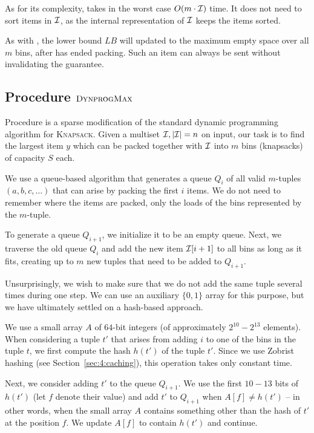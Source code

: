 As for its complexity, \bfd takes in the worst case $O(m \cdot {\mathcal I})$
time. It does not need to sort items in ${\mathcal I}$, as the internal
representation of ${\mathcal I}$ keeps the items sorted.

As with \obf, the lower bound $LB$ will updated to the maximum empty
space over all $m$ bins, after \bfd has ended packing. Such an item
can always be sent without invalidating the \binstretch guarantee.

\subsection{Procedure $\textsc{DynprogMax}$}\label{sec:4:dynprogmax}

Procedure \DynprogMax is a sparse modification of the standard dynamic
programming algorithm for \textsc{Knapsack}. Given a multiset ${\mathcal I},
|{\mathcal I}| = n$ on input, our task is to find the largest item $y$
which can be packed together with ${\mathcal I}$ into $m$ bins (knapsacks) of
capacity $S$ each.


We use a queue-based algorithm that generates a queue $Q_i$ of all
valid $m$-tuples $(a,b,c,\ldots)$ that can arise by packing the first
$i$ items. We do not need to remember where the items are packed, only
the loads of the bins represented by the $m$-tuple.

To generate a queue $Q_{i+1}$, we initialize it to be an empty queue.
Next, we traverse the old queue $Q_i$ and add the new item
${\mathcal I}[i+1]$ to all bins as long as it fits, creating up to $m$ new
tuples that need to be added to $Q_{i+1}$.

Unsurprisingly, we wish to make sure that we do not add the same tuple
several times during one step. We can use an auxiliary $\{0,1\}$ array
for this purpose, but we have ultimately settled on a hash-based
approach.

We use a small array $A$ of $64$-bit integers (of approximately $2^{10} -
2^{13}$ elements). When considering a tuple $t'$ that arises from
adding $i$ to one of the bins in the tuple $t$, we first compute the
hash $h(t')$ of the tuple $t'$. Since we use Zobrist hashing (see
Section~\ref{sec:4:caching}), this operation takes only constant time.

Next, we consider adding $t'$ to the queue $Q_{i+1}$. We use the first
$10-13$ bits of $h(t')$ (let $f$ denote their value) and add $t'$ to
$Q_{i+1}$ when $A[f] \neq h(t')$ -- in other words, when the small
array $A$ contains something other than the hash of $t'$ at the
position $f$. We update $A[f]$ to contain $h(t')$ and continue.

